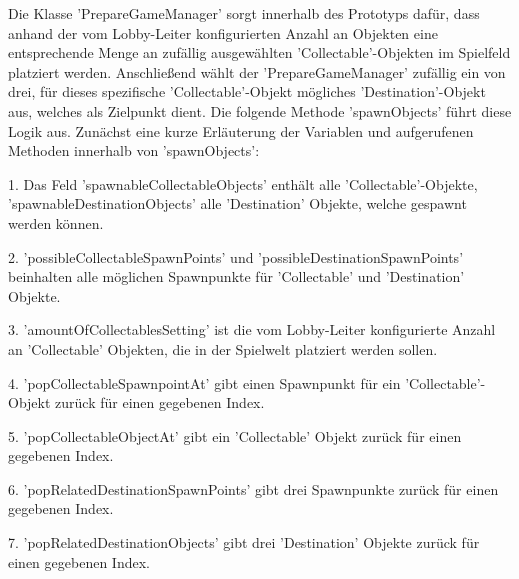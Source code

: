 Die Klasse 'PrepareGameManager' sorgt innerhalb des Prototyps dafür, dass anhand der vom Lobby-Leiter konfigurierten Anzahl an Objekten eine entsprechende Menge an zufällig ausgewählten 'Collectable'-Objekten im Spielfeld platziert werden. Anschließend wählt der 'PrepareGameManager' zufällig ein von drei, für dieses spezifische 'Collectable'-Objekt mögliches 'Destination'-Objekt aus, welches als Zielpunkt dient. Die folgende Methode 'spawnObjects' führt diese Logik aus. Zunächst eine kurze Erläuterung der Variablen und aufgerufenen Methoden innerhalb von 'spawnObjects':

1. Das Feld 'spawnableCollectableObjects' enthält alle 'Collectable'-Objekte, 'spawnableDestinationObjects' alle 'Destination' Objekte, welche gespawnt werden können.

2. 'possibleCollectableSpawnPoints' und 'possibleDestinationSpawnPoints' beinhalten alle möglichen Spawnpunkte für 'Collectable' und 'Destination' Objekte.

3. 'amountOfCollectablesSetting' ist die vom Lobby-Leiter konfigurierte Anzahl an 'Collectable' Objekten, die in der Spielwelt platziert werden sollen.

4. 'popCollectableSpawnpointAt' gibt einen Spawnpunkt für ein 'Collectable'-Objekt zurück für einen gegebenen Index.

5. 'popCollectableObjectAt' gibt ein 'Collectable' Objekt zurück für einen gegebenen Index.

6. 'popRelatedDestinationSpawnPoints' gibt drei Spawnpunkte zurück für einen gegebenen Index.

7. 'popRelatedDestinationObjects' gibt drei 'Destination' Objekte zurück für einen gegebenen Index.


